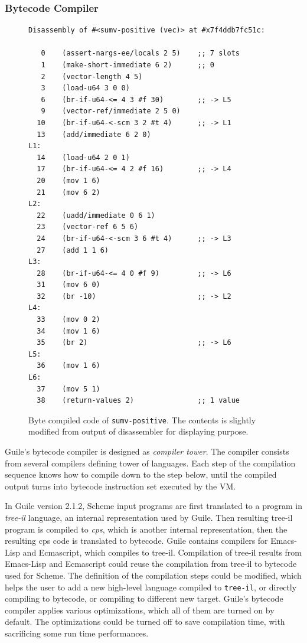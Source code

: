 \documentclass[preprint, 10pt]{sigplanconf}
\begin{document}
\subsubsection{Bytecode Compiler}

\begin{figure}
  \begin{center}
    \small
\begin{verbatim}
Disassembly of #<sumv-positive (vec)> at #x7f4ddb7fc51c:

   0    (assert-nargs-ee/locals 2 5)    ;; 7 slots
   1    (make-short-immediate 6 2)      ;; 0
   2    (vector-length 4 5)
   3    (load-u64 3 0 0)
   6    (br-if-u64-<= 4 3 #f 30)        ;; -> L5
   9    (vector-ref/immediate 2 5 0)
  10    (br-if-u64-<-scm 3 2 #t 4)      ;; -> L1
  13    (add/immediate 6 2 0)
L1:
  14    (load-u64 2 0 1)
  17    (br-if-u64-<= 4 2 #f 16)        ;; -> L4
  20    (mov 1 6)
  21    (mov 6 2)
L2:
  22    (uadd/immediate 0 6 1)
  23    (vector-ref 6 5 6)
  24    (br-if-u64-<-scm 3 6 #t 4)      ;; -> L3
  27    (add 1 1 6)
L3:
  28    (br-if-u64-<= 4 0 #f 9)         ;; -> L6
  31    (mov 6 0)
  32    (br -10)                        ;; -> L2
L4:
  33    (mov 0 2)
  34    (mov 1 6)
  35    (br 2)                          ;; -> L6
L5:
  36    (mov 1 6)
L6:
  37    (mov 5 1)
  38    (return-values 2)               ;; 1 value
\end{verbatim}
\end{center}
\caption{Byte compiled code of \texttt{sumv-positive}. The contents is slightly
  modified from output of disassembler for displaying purpose.}
\label{fig:bytecode}
\end{figure}

Guile's bytecode compiler is designed as \textit{compiler tower}. The compiler
consists from several compilers defining tower of languages. Each step of the
compilation sequence knows how to compile down to the step below, until the
compiled output turns into bytecode instruction set executed by the VM.\@

In Guile version 2.1.2, Scheme input programs are first translated to a program
in \textit{tree-il} language, an internal representation used by Guile. Then
resulting tree-il program is compiled to \textit{cps}, which is another internal
representation, then the resulting cps code is translated to bytecode. Guile
contains compilers for Emacs-Lisp and Ecmascript, which compiles to
tree-il. Compilation of tree-il results from Emacs-Lisp and Ecmascript could
reuse the compilation from tree-il to bytecode used for Scheme. The definition
of the compilation steps could be modified, which helps the user to add a new
high-level language compiled to \texttt{tree-il}, or directly compiling to
bytecode, or compiling to different new target. Guile's bytecode compiler
applies various optimizations, which all of them are turned on by default. The
optimizations could be turned off to save compilation time, with sacrificing
some run time performances.
\end{document}
